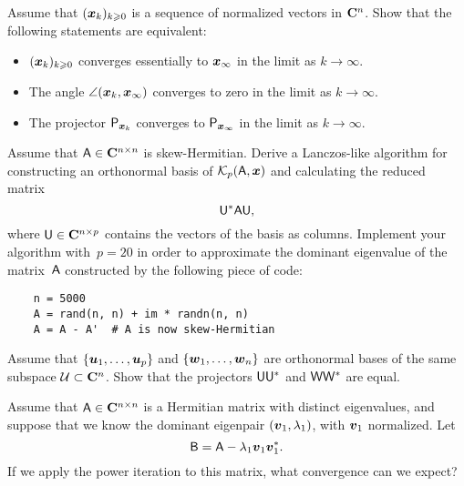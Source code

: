 \begin{exercise}
    \label{exercise:essential_convergence}
    Assume that $(\mathbf{\boldsymbol{x}}_k)_{k \geqslant 0}$ is a sequence of normalized vectors in $\mathbf C^n$.
    Show that the following statements are equivalent:
    \begin{itemize}
        \item $(\mathbf{\boldsymbol{x}}_k)_{k \geqslant 0}$ converges essentially to $\mathbf{\boldsymbol{x}}_{\infty}$ in the limit as $k \to \infty$.
        \item The angle $\angle(\mathbf{\boldsymbol{x}}_k, \mathbf{\boldsymbol{x}}_{\infty})$ converges to zero in the limit as $k \to \infty$.
        \item The projector $\mathsf P_{\mathbf{\boldsymbol{x}}_k}$ converges to $\mathsf P_{\mathbf{\boldsymbol{x}}_{\infty}}$ in the limit as $k \to \infty$.
    \end{itemize}
\end{exercise}

\begin{exercise}
    Assume that $\mathsf A \in \mathbf C^{n \times n}$ is skew-Hermitian.
    Derive a Lanczos-like algorithm for constructing an orthonormal basis of $\mathcal K_p(\mathsf A, \mathbf{\boldsymbol{x}})$
    and calculating the reduced matrix
    \[
        \mathsf U^* \mathsf A \mathsf U,
    \]
    where $\mathsf U \in \mathbf C^{n \times p}$ contains the vectors of the basis as columns.
    Implement your algorithm with~$p = 20$ in order to approximate the dominant eigenvalue of the matrix~$\mathsf A$ constructed by the following piece of code:
    \begin{verbatim}
    n = 5000
    A = rand(n, n) + im * randn(n, n)
    A = A - A'  # A is now skew-Hermitian
    \end{verbatim}
\end{exercise}

\begin{exercise}
    Assume that $\{\mathbf{\boldsymbol{u}}_1, \dotsc, \mathbf{\boldsymbol{u}}_p \}$ and $\{\mathbf{\boldsymbol{w}}_1, \dotsc, \mathbf{\boldsymbol{w}}_n\}$
    are orthonormal bases of the same subspace $\mathcal U \subset \mathbf C^n$.
    Show that the projectors $\mathsf U \mathsf U^*$ and $\mathsf W \mathsf W^*$ are equal.
\end{exercise}

\begin{exercise}
    Assume that $\mathsf A \in \mathbf C^{n \times n}$ is a Hermitian matrix with distinct eigenvalues,
    and suppose that we know the dominant eigenpair $(\mathbf{\boldsymbol{v}}_1, \lambda_1)$,
    with $\mathbf{\boldsymbol{v}}_1$ normalized.
    Let
    \[
        \mathsf B = \mathsf A - \lambda_1 \mathbf{\boldsymbol{v}}_1 \mathbf{\boldsymbol{v}}_1^*.
    \]
    If we apply the power iteration to this matrix,
    what convergence can we expect?
\end{exercise}

